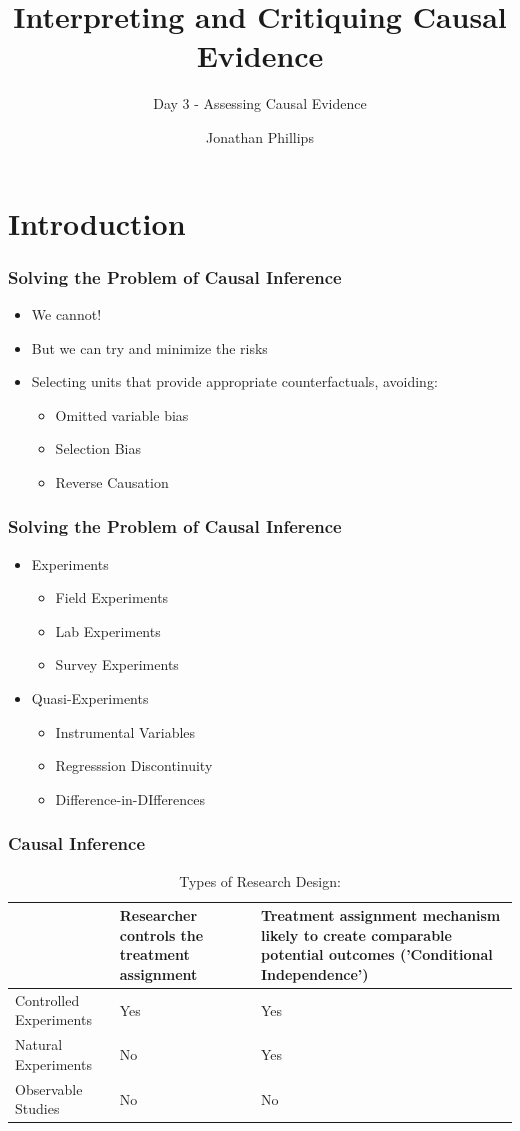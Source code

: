\documentclass[xcolor=x11names,compress]{beamer}\usepackage[]{graphicx}\usepackage[]{xcolor}
\title{Interpreting and Critiquing Causal Evidence}
\subtitle{Day 3 - Assessing Causal Evidence}
\author{Jonathan Phillips}
\renewcommand{\(}{\begin{columns}}
\renewcommand{\)}{\end{columns}}
\newcommand{\<}[1]{\begin{column}{#1}}
\renewcommand{\>}{\end{column}}
\begin{document}
\frame{\titlepage}

\section{Introduction}

\begin{frame}
\frametitle{Solving the Problem of Causal Inference}
\begin{itemize}
\item We cannot!
\item But we can try and minimize the risks
\item Selecting units that provide appropriate counterfactuals, avoiding:
\begin{itemize}
\item Omitted variable bias
\item Selection Bias
\item Reverse Causation
\end{itemize}
\end{itemize}
\end{frame}

\begin{frame}
\frametitle{Solving the Problem of Causal Inference}
\begin{itemize}
\item Experiments
\begin{itemize}
\item Field Experiments
\item Lab Experiments
\item Survey Experiments
\end{itemize}
\item Quasi-Experiments
\begin{itemize}
\item Instrumental Variables
\item Regresssion Discontinuity
\item Difference-in-DIfferences
\end{itemize}
\end{itemize}
\end{frame}

\begin{frame}
\frametitle{Causal Inference}
\begin{table}[htbp]
  \centering
  \caption{Types of Research Design:}
    \begin{tabular}{|p{3.5cm}|p{3.5cm}|p{3.5cm}|}
    \toprule
          & Researcher controls the treatment assignment & Treatment assignment mechanism likely to create comparable potential outcomes ('Conditional Independence') \\
    \midrule
    Controlled Experiments & Yes   & Yes \\
    \midrule
    Natural Experiments & No    & Yes \\
    \midrule
    Observable Studies & No    & No \\
    \bottomrule
    \end{tabular}%
  \label{tab:addlabel}%
\end{table}%
\end{frame}
\end{document}
